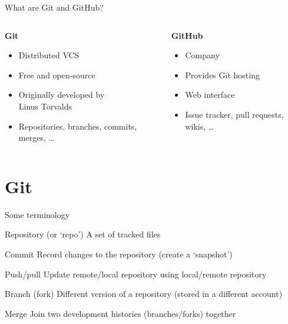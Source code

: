 \begin{frame}{What are Git and GitHub?}
    \begin{columns}[t]
        \begin{column}{0.5\textwidth}
            \begin{center}
                \textbf{Git}
            \end{center}
            \begin{itemize}
                \item Distributed VCS
                \item Free and open\hyp{}source
                \item Originally developed by \\ Linus Torvalds
                \item Repositories, branches, commits, merges, \ldots
            \end{itemize}
        \end{column}
        \begin{column}{0.5\textwidth}
            \begin{center}
                \textbf{GitHub}
            \end{center}
            \begin{itemize}
                \item Company
                \item Provides Git hosting
                \item Web interface
                \item Issue tracker, pull requests, wikis, \ldots
            \end{itemize}
        \end{column}
    \end{columns}
\end{frame}

\section{Git}

\begin{frame}{Some terminology}
    \vspace{0.5em}
    \begin{block}{Repository (or `repo')}
        A set of tracked files
    \end{block}
    \vfill
    \begin{block}{Commit}
        Record changes to the repository (create a `snapshot')
    \end{block}
    \vfill
    \begin{block}{Push/pull}
        Update remote/local repository using local/remote repository
    \end{block}
    \vfill
    \begin{block}{Branch (fork)}
        Different version of a repository (stored in a different account)
    \end{block}
    \vfill
    \begin{block}{Merge}
        Join two development histories (branches/forks) together
    \end{block}
\end{frame}

